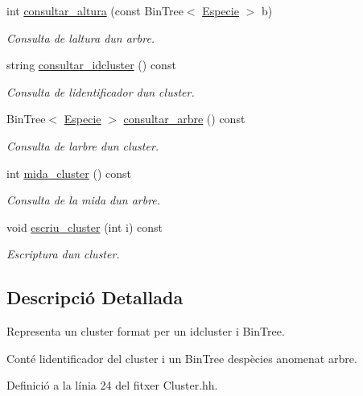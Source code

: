 \begin{DoxyCompactItemize}
int \hyperlink{class_cluster_afd618d800539e0d228c7f2e0a03f8561}{consultar\+\_\+altura} (const Bin\+Tree$<$ \hyperlink{class_especie}{Especie} $>$ b)
\begin{DoxyCompactList}\small\item\em Consulta de l\textquotesingle{}altura d\textquotesingle{}un arbre. \end{DoxyCompactList}\item 
string \hyperlink{class_cluster_ae12763894ce5a3f551d7c6ba16f13db8}{consultar\+\_\+idcluster} () const
\begin{DoxyCompactList}\small\item\em Consulta de l\textquotesingle{}identificador d\textquotesingle{}un cluster. \end{DoxyCompactList}\item 
Bin\+Tree$<$ \hyperlink{class_especie}{Especie} $>$ \hyperlink{class_cluster_a0fdd12bda86041ea38bd761adb90f72b}{consultar\+\_\+arbre} () const
\begin{DoxyCompactList}\small\item\em Consulta de l\textquotesingle{}arbre d\textquotesingle{}un cluster. \end{DoxyCompactList}\item 
int \hyperlink{class_cluster_a4c8575921b44eae850575e1b199364f8}{mida\+\_\+cluster} () const
\begin{DoxyCompactList}\small\item\em Consulta de la mida d\textquotesingle{}un arbre. \end{DoxyCompactList}\item 
void \hyperlink{class_cluster_a965f3fd78351c4eb06864f4811993823}{escriu\+\_\+cluster} (int i) const
\begin{DoxyCompactList}\small\item\em Escriptura d\textquotesingle{}un cluster. \end{DoxyCompactList}\end{DoxyCompactItemize}


\subsection{Descripció Detallada}
Representa un cluster format per un idcluster i Bin\+Tree. 

Conté l\textquotesingle{}identificador del cluster i un Bin\+Tree d\textquotesingle{}espècies anomenat arbre. 

Definició a la línia 24 del fitxer Cluster.\+hh.



